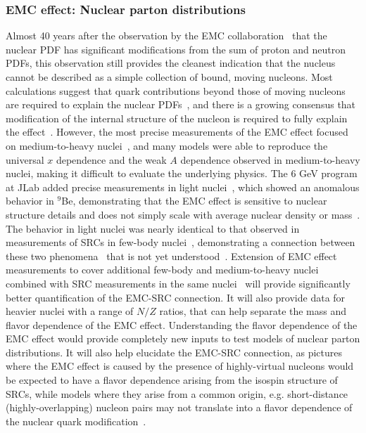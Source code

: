 \subsubsection{EMC effect: Nuclear parton distributions}

\label{sec:ALERTmeasurements}

Almost 40 years after the observation by the EMC collaboration~\cite{EuropeanMuon:1983wih} that the nuclear PDF has significant modifications from the sum of proton and neutron PDFs, this observation still provides the cleanest indication that the nucleus cannot be described as a simple collection of bound, moving nucleons. Most calculations suggest that quark contributions beyond those of moving nucleons are required to explain the nuclear PDFs~\cite{Geesaman:1995yd, Arrington:2011xs, Malace:2014uea}, and there is a growing consensus that modification of the internal structure of the nucleon is required to fully explain the effect~\cite{Miller:2001tg, Sargsian:2002wc, Hen:2016kwk}. However, the most precise measurements of the EMC effect focused on medium-to-heavy nuclei~\cite{Gomez:1993ri}, and many models were able to reproduce the universal $x$ dependence and the weak $A$ dependence observed in medium-to-heavy nuclei, making it difficult to evaluate the underlying physics. The 6 GeV program at JLab added precise measurements in light nuclei~\cite{Seely:2009gt}, which showed an anomalous behavior in $^9$Be, demonstrating that the EMC effect is sensitive to nuclear structure details and does not simply scale with average nuclear density or mass~\cite{Arrington:2012ax}. The behavior in light nuclei was nearly identical to that observed in measurements of SRCs in few-body nuclei~\cite{Fomin:2011ng}, demonstrating a connection between these two phenomena~\cite{Arrington:2012ax, Hen:2016kwk} that is not yet understood~\cite{CLAS:2019vsb, Arrington:2019wky}. 
Extension of EMC effect measurements to cover additional few-body and medium-to-heavy nuclei combined with SRC measurements in the same nuclei~\cite{E12-06-105} will provide significantly better quantification of the EMC-SRC connection. It will also provide data for heavier nuclei with a range of $N/Z$ ratios, that can help separate the mass and flavor dependence of the EMC effect. Understanding the flavor dependence of the EMC effect would provide completely new inputs to test models of nuclear parton distributions. It will also help elucidate the EMC-SRC connection, as pictures where the EMC effect is caused by the presence of highly-virtual nucleons would be expected to have a flavor dependence arising from the isospin structure of SRCs, while models where they arise from a common origin, e.g. short-distance (highly-overlapping) nucleon pairs may not translate into a flavor dependence of the nuclear quark modification~\cite{Arrington:2012ax, Arrington:2019wky}.

